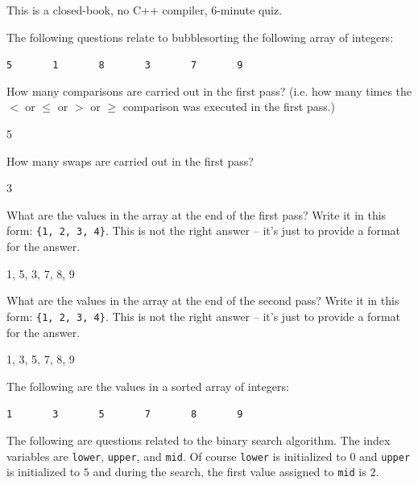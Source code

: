 

This is a closed-book, no C++ compiler, 6-minute quiz.

The following questions relate to bubblesorting the following array of integers:
\begin{center}
\verb!5       1       8       3       7       9!
\end{center}

\nextq
How many comparisons are carried out in the first pass?
(i.e. how many times the $< $ or $\leq$ or $>$ or $\geq$
comparison was executed in the first pass.)
\\
\ANSWER
\begin{answercode}
5
\end{answercode}

\nextq
How many swaps are carried out in the first pass?
\\
\ANSWER
\begin{answercode}
3
\end{answercode}

\nextq
What are the values in the array at the end of the first pass?
Write it in this form: \verb!{1, 2, 3, 4}!.
This is not the right answer -- it's just to provide a format for the answer.
\\
\ANSWER
\begin{answercode}
{1, 5, 3, 7, 8, 9}
\end{answercode}

\nextq
What are the values in the array at the end of the second pass?
Write it in this form: \verb!{1, 2, 3, 4}!.
This is not the right answer -- it's just to provide a format for the answer.
\\
\ANSWER
\begin{answercode}
{1, 3, 5, 7, 8, 9}
\end{answercode}

The following are the values in a sorted array of integers:
\begin{center}
\verb!1       3       5       7       8       9!
\end{center}
The following are questions related to the binary search algorithm.
The index variables are \verb!lower!, \verb!upper!, and \verb!mid!.
Of course \verb!lower! is initialized to $0$ and \verb!upper! is initialized to
$5$ and during the search, the first value assigned to \verb!mid! is $2$.

